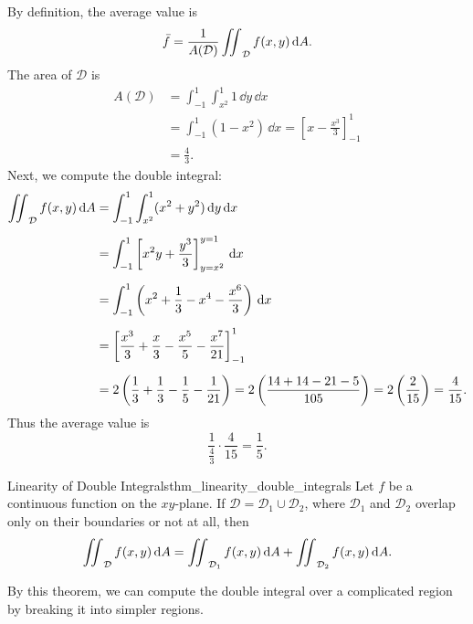 \begin{sol}
By definition, the average value is
\[
    \bar{f} = \frac{1}{A(\mathcal{D})} \mathop{\int\mkern-10mu\int}\nolimits_{\mathcal{D}} f(x, y) \, \mathrm{d}A.
\]
The area of $\mathcal{D}$ is
\begin{align*}
    A(\mathcal{D}) &= \int_{-1}^{1} \int_{x^2}^{1} 1 \, \dd{y} \, \dd{x} \\[0.5em]
    &= \int_{-1}^{1} (1 - x^2) \, \dd{x} = \left[x - \frac{x^3}{3}\right]_{-1}^{1} \\
    &= \frac{4}{3}.
\end{align*}
Next, we compute the double integral:
\begin{align*}
    \mathop{\int\mkern-10mu\int}\nolimits_{\mathcal{D}} f(x, y) \, \mathrm{d}A &= \int_{-1}^{1} \int_{x^2}^{1} (x^2 + y^2) \, \mathrm{d}y \, \mathrm{d}x \\[0.5em]
    &= \int_{-1}^{1} \left[x^2y + \frac{y^3}{3}\right]_{y = x^2}^{y = 1} \, \mathrm{d}x \\[0.5em]
    &= \int_{-1}^{1} \left(x^2 + \frac{1}{3} - x^4 - \frac{x^6}{3}\right) \, \mathrm{d}x \\[0.5em]
    &= \left[\frac{x^3}{3} + \frac{x}{3} - \frac{x^5}{5} - \frac{x^7}{21}\right]_{-1}^{1} \\[0.5em]
    &= 2\left(\frac{1}{3} + \frac{1}{3} - \frac{1}{5} - \frac{1}{21}\right) = 2\left(\frac{14 + 14 - 21 - 5}{105}\right) = 2\left(\frac{2}{15}\right) = \frac{4}{15}.
\end{align*}
Thus the average value is
\[
    \frac{1}{\frac{4}{3}} \cdot \frac{4}{15} = \frac{1}{5}.
\]
\end{sol}

\begin{theorem}{Linearity of Double Integrals}{thm_linearity_double_integrals}
Let $f$ be a continuous function on the $xy$-plane. If $\mathcal{D} = \mathcal{D}_1 \cup \mathcal{D}_2$, where $\mathcal{D}_1$ and $\mathcal{D}_2$ overlap only on their boundaries
or not at all, then
\[
    \mathop{\int\mkern-10mu\int}\nolimits_{\mathcal{D}} f(x, y) \, \mathrm{d}A = \mathop{\int\mkern-10mu\int}\nolimits_{\mathcal{D}_1} f(x, y) \, \mathrm{d}A + \mathop{\int\mkern-10mu\int}\nolimits_{\mathcal{D}_2} f(x, y) \, \mathrm{d}A.
\]
\end{theorem}

By this theorem, we can compute the double integral over a complicated region by breaking it into simpler regions.